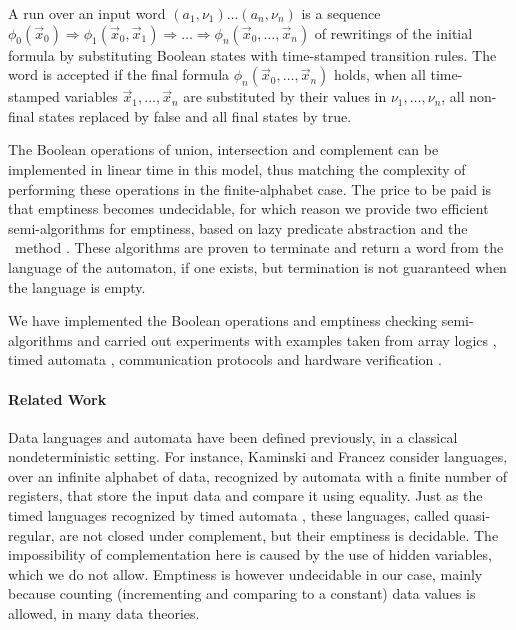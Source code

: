 \documentclass[10pt]{llncs}
\begin{document}
A run over an input word $(a_1,\nu_1) \ldots (a_n,\nu_n)$ is a
sequence $\phi_0(\vec{x}_0) \Rightarrow \phi_1(\vec{x}_0,\vec{x}_1)
\Rightarrow \ldots \Rightarrow \phi_n(\vec{x}_0,\ldots,\vec{x}_n)$ of
rewritings of the initial formula by substituting Boolean states with
time-stamped transition rules. The word is accepted if the final
formula $\phi_n(\vec{x}_0,\ldots,\vec{x}_n)$ holds, when all
time-stamped variables $\vec{x}_1,\ldots,\vec{x}_n$ are substituted by
their values in $\nu_1,\ldots,\nu_n$, all non-final states replaced by
false and all final states by true.

The Boolean operations of union, intersection and complement can be
implemented in linear time in this model, thus matching the complexity
of performing these operations in the finite-alphabet case. The price
to be paid is that emptiness becomes undecidable, for which reason we
provide two efficient semi-algorithms for emptiness, based on lazy
predicate abstraction \cite{HJMS02} and the \impact~method
\cite{mcmillan06}.  These algorithms are proven to terminate and
return a word from the language of the automaton, if one exists, but
termination is not guaranteed when the language is empty.


We have implemented the Boolean operations and emptiness checking
semi-algorithms and carried out experiments with examples taken from
array logics \cite{cav09}, timed automata
\cite{henzinger:RealTimeSystems}, communication protocols \cite{abp}
and hardware verification \cite{smrcka}.

\paragraph{Related Work}
Data languages and automata have been defined previously, in a
classical nondeterministic setting. For instance, Kaminski and Francez
\cite{Kaminski94} consider languages, over an infinite alphabet of
data, recognized by automata with a finite number of registers, that
store the input data and compare it using equality. Just as the timed
languages recognized by timed automata \cite{AlurDill94}, these
languages, called quasi-regular, are not closed under complement, but
their emptiness is decidable. The impossibility of complementation
here is caused by the use of hidden variables, which we do not
allow. Emptiness is however undecidable in our case, mainly because
counting (incrementing and comparing to a constant) data values is
allowed, in many data theories.
\end{document}
